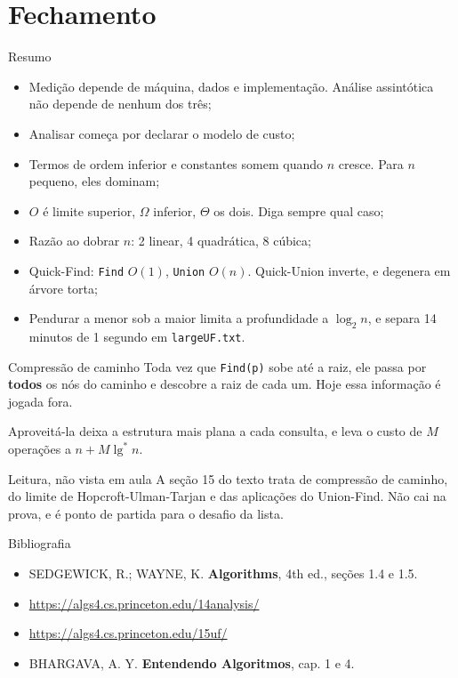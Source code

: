 \documentclass{beamer}
\begin{document}
\section*{Fechamento}

\begin{frame}{Resumo}
	\small
	\begin{itemize}
		\item Medição depende de máquina, dados e implementação. Análise
		      assintótica não depende de nenhum dos três;
		\item Analisar começa por declarar o modelo de custo;
		\item Termos de ordem inferior e constantes somem quando $n$ cresce. Para
		      $n$ pequeno, eles dominam;
		\item $O$ é limite superior, $\Omega$ inferior, $\Theta$ os dois. Diga
		      sempre qual caso;
		\item Razão ao dobrar $n$: 2 linear, 4 quadrática, 8 cúbica;
		\item Quick-Find: \texttt{Find} $O(1)$, \texttt{Union} $O(n)$. Quick-Union
		      inverte, e degenera em árvore torta;
		\item Pendurar a menor sob a maior limita a profundidade a $\log_2 n$, e
		      separa 14 minutos de 1 segundo em \texttt{largeUF.txt}.
	\end{itemize}
\end{frame}

\begin{frame}{Compressão de caminho}
	Toda vez que \texttt{Find(p)} sobe até a raiz, ele passa por \textbf{todos}
	os nós do caminho e descobre a raiz de cada um. Hoje essa informação é
	jogada fora.

	\vspace{0.4cm}
	Aproveitá-la deixa a estrutura mais plana a cada consulta, e leva o custo de
	$M$ operações a $n + M \lg^{*} n$.

	\vspace{0.5cm}
	\begin{alertblock}{Leitura, não vista em aula}
		A seção 15 do texto trata de compressão de caminho, do limite de
		Hopcroft-Ulman-Tarjan e das aplicações do Union-Find. Não cai na prova, e
		é ponto de partida para o desafio da lista.
	\end{alertblock}
\end{frame}

\begin{frame}{Bibliografia}
	\begin{itemize}
		\item SEDGEWICK, R.; WAYNE, K. \textbf{Algorithms}, 4th ed., seções 1.4 e 1.5.
		\item \url{https://algs4.cs.princeton.edu/14analysis/}
		\item \url{https://algs4.cs.princeton.edu/15uf/}
		\item BHARGAVA, A. Y. \textbf{Entendendo Algoritmos}, cap. 1 e 4.
	\end{itemize}
\end{frame}
\end{document}
